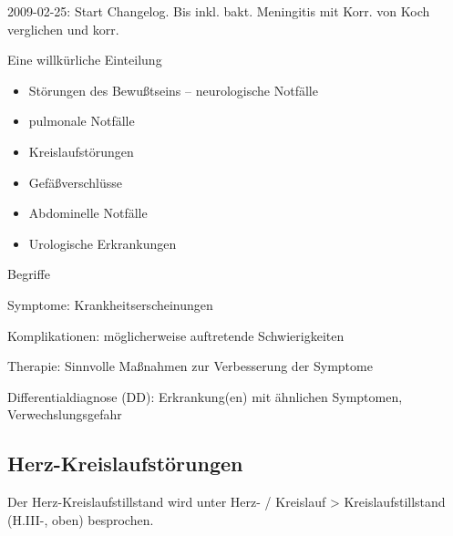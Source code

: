 \documentclass{article}
\begin{document}
2009-02-25: Start Changelog. Bis inkl. bakt. Meningitis mit Korr. von
Koch verglichen und korr.

Eine willk\"urliche Einteilung

\begin{itemize}
\item St\"orungen des Bewu{\ss}tseins --  neurologische Notf\"alle

\item pulmonale Notf\"alle

\item Kreislaufst\"orungen

\item Gef\"a{\ss}verschl\"usse

\item Abdominelle Notf\"alle

\item Urologische Erkrankungen

\end{itemize}
Begriffe

Symptome: Krankheitserscheinungen

Komplikationen: m\"oglicherweise auftretende Schwierigkeiten

Therapie: Sinnvolle Ma{\ss}nahmen zur Verbesserung der  Symptome

Differentialdiagnose (DD): Erkrankung(en) mit \"ahnlichen Symptomen, 
Ver\-wechslungs\-gefahr

\subsection[Herz-Kreislaufst\"orungen]{Herz-Kreislaufst\"orungen}
\label{bkm:RefHeading42342802}Der Herz-Kreislaufstillstand wird unter 
Herz- / Kreislauf {\textgreater} Kreislaufstillstand 
(H.III{}-\pageref{bkm:RefHeading42514602}, oben) besprochen.
\end{document}
